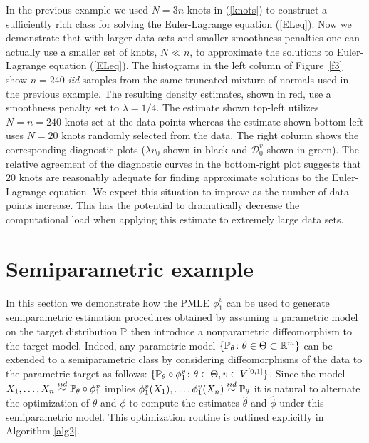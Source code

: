 \documentclass[noinfoline]{imsart}
\begin{document}
In the previous example we used $N=3n$ knots in (\ref{knots}) to construct a sufficiently rich class for solving the Euler-Lagrange equation (\ref{ELeq}). Now we demonstrate that with larger data sets and smaller smoothness penalties one can actually use a smaller set of knots, $N\ll n$, to approximate the solutions to Euler-Lagrange equation (\ref{ELeq}). The histograms in the left column of Figure~\ref{f3} show $n=240$ {\em iid}  samples from the same truncated mixture of normals used in the previous example. The resulting density estimates, shown in red,  use a smoothness penalty set to $\lambda=1/4$. The estimate shown top-left  utilizes  $N=n=240$ knots set at the data points whereas the estimate shown bottom-left  uses $N=20$ knots randomly selected from the data.  The right column
shows the corresponding diagnostic plots ($\lambda v_0$ shown in black  and $\mathcal D_0^v$ shown in green). The relative agreement of the diagnostic curves in the bottom-right plot suggests that 20 knots are reasonably adequate for finding approximate solutions to the Euler-Lagrange equation. We expect this situation to improve as the number of data points increase. This has the potential to dramatically decrease the computational load when applying this estimate to extremely large data sets.






\section{Semiparametric example}
\label{spe}

In this section we demonstrate how the PMLE $\phi_1^{\hat v}$ can be used to generate semiparametric estimation procedures obtained by assuming a parametric model on the target distribution $\Bbb P$ then introduce a nonparametric diffeomorphism to the target model.
Indeed, any parametric model $\{\Bbb P_\theta\colon \theta\in \Theta\subset \Bbb R^m\}$ can  be extended to a   semiparametric class by considering diffeomorphisms of the data to the parametric target as follows: $\{\Bbb P_\theta \circ \phi^{v}_1 \colon \theta\in \Theta, v\in V^{[0,1]}\}$.
Since the  model $X_1,\ldots, X_n\overset{iid}\sim \Bbb P_\theta\circ \phi^v_1$ implies $\phi^v_1(X_1),\ldots, \phi_1^v(X_n)\overset{iid}\sim \Bbb P_\theta$ it is natural to alternate the optimization of $\theta$ and $\phi$ to compute the estimates $\hat \theta$ and $\hat \phi$ under this semiparametric model. This optimization routine is outlined explicitly in Algorithm \ref{alg2}.
\end{document}
